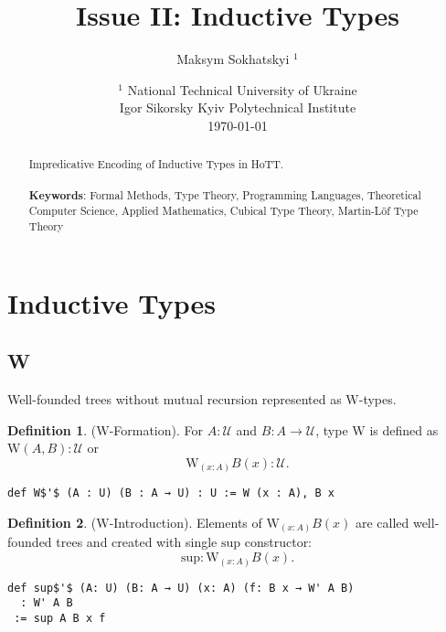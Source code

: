 \documentclass{article}
\theoremstyle{definition}
\newtheorem{definition}{Definition}
\begin{document}
\title{Issue II: Inductive Types}
\author{Maksym Sokhatskyi $^1$}
\date{ $^1$ National Technical University of Ukraine \\
       \small Igor Sikorsky Kyiv Polytechnical Institute \\
       \today }

\maketitle

\begin{abstract}

Impredicative Encoding of Inductive Types in HoTT.
\\
\\
{\bf Keywords}: Formal Methods, Type Theory, Programming Languages,
          Theoretical Computer Science, Applied Mathematics,
          Cubical Type Theory, Martin-Löf Type Theory
\end{abstract}

\tableofcontents
\newpage

\section{Inductive Types}

\subsection{W}

Well-founded trees without mutual recursion represented as $\mathrm{W}$-types.

\begin{definition} ($\mathrm{W}$-Formation).
For $A : \mathcal{U}$ and $B : A \rightarrow \mathcal{U}$, type $\mathrm{W}$
is defined as $\mathrm{W}(A,B) : \mathcal{U}$ or
$$
   \mathrm{W}_{(x : A)} B(x) : \mathcal{U}.
$$
\begin{lstlisting}[mathescape=true]
def W$'$ (A : U) (B : A → U) : U := W (x : A), B x
\end{lstlisting}
\end{definition}

\begin{definition} ($\mathrm{W}$-Introduction).
Elements of $\mathrm{W}_{(x : A)} B(x)$ are called
well-founded trees and created with single $\mathrm{sup}$ constructor:
$$
  \mathrm{sup} : \mathrm{W}_{(x: A)} B(x).
$$
\begin{lstlisting}
def sup$'$ (A: U) (B: A → U) (x: A) (f: B x → W' A B)
  : W' A B
 := sup A B x f
\end{lstlisting}
\end{definition}
\end{document}
